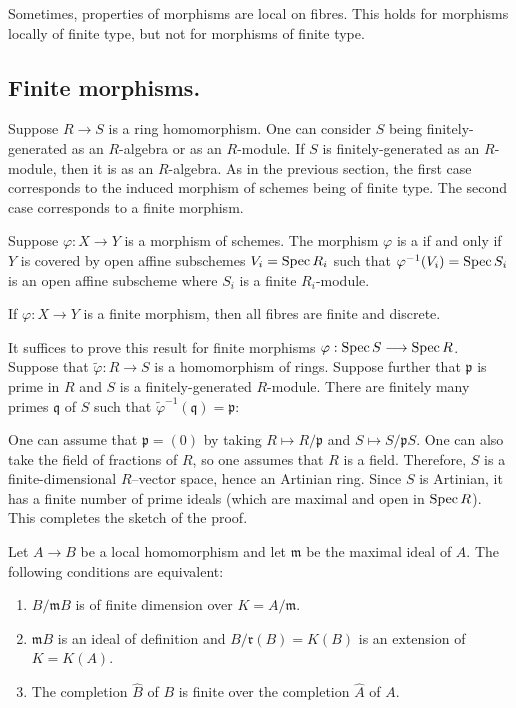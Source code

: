 \documentclass [11 pt, oneside] {article}
\begin{document}
\begin{remark}
	Sometimes, properties of morphisms are local on fibres. This holds for morphisms locally of finite type, but not for morphisms of finite type.
\end{remark}

\subsection{Finite morphisms.}
Suppose $R\longrightarrow S$ is a ring homomorphism. One can consider $S$ being finitely-generated as an $R$-algebra or as an $R$-module. If $S$ is finitely-generated as an $R$-module, then it is as an $R$-algebra. As in the previous section, the first case corresponds to the induced morphism of schemes being of finite type. The second case corresponds to a finite morphism.

Suppose $\varphi:X\longrightarrow Y$ is a morphism of schemes. The morphism $\varphi$ is a  if and only if $Y$ is covered by open affine subschemes $V_i = \operatorname{Spec} R_i$ such that $\varphi^{-1}(V_i) =\operatorname{Spec} S_i$ is an open affine subscheme where $S_i$ is a finite $R_i$-module. 

\begin{proposition}
If $\varphi:X\longrightarrow Y$ is a finite morphism, then all fibres are finite and discrete.
\end{proposition}

It suffices to prove this result for finite morphisms $\varphi: \operatorname{Spec} S\longrightarrow \operatorname{Spec} R$. Suppose that $\tilde\varphi :R\longrightarrow S$ is a homomorphism of rings. Suppose further that $\mathfrak{p}$ is prime in $R$ and $S$ is a finitely-generated $R$-module. There are finitely many primes $\mathfrak{q}$ of $S$ such that $\tilde\varphi^{-1}(\mathfrak{q})=\mathfrak{p}$: 

One can assume that $\mathfrak{p}=(0)$ by taking $R \longmapsto R/\mathfrak{p}$ and $S\longmapsto S/\mathfrak{p}S$. One can also take the field of fractions of $R$, so one assumes that $R$ is a field. Therefore, $S$ is a finite-dimensional $R$--vector space, hence an Artinian ring. Since $S$ is Artinian, it has a finite number of prime ideals (which are maximal and open in $\operatorname{Spec} R$). This completes the sketch of the proof.

\begin{proposition}\label{}\text{}
Let $A\longrightarrow B$ be a local homomorphism and let $\mathfrak{m}$ be the maximal ideal of $A$. The following conditions are equivalent:
\begin{enumerate}
	\item $B/\mathfrak{m}B$ is of finite dimension over $K=A/\mathfrak{m}$.
	\item $\mathfrak{m}B$ is an ideal of definition and $B/\mathfrak{r}(B) = K(B)$ is an extension of $K=K(A)$.
	\item The completion $\widehat{B}$ of $B$ is finite over the completion $\widehat{A}$ of $A$.
\end{enumerate}
\end{proposition}
\end{document}
